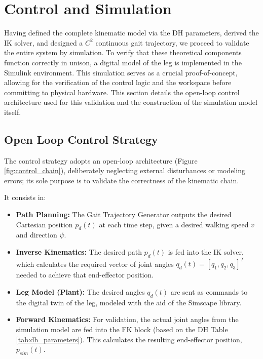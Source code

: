 \section{Control and Simulation}
\label{sc:simulation}

Having defined the complete kinematic model via the DH parameters, derived the IK solver, and designed a $C^2$
continuous gait trajectory, we proceed to validate the entire system by simulation. To verify that these
theoretical components function correctly in unison, a digital model of the leg is implemented in the
Simulink \cite{matlab} environment. This simulation serves as a crucial proof-of-concept, allowing for the
verification of the control logic and the workspace before committing to physical hardware. This section details
the open-loop control architecture used for this validation and the construction of the simulation model itself.


\subsection{Open Loop Control Strategy}

The control strategy adopts an open-loop architecture (Figure \ref{fig:control_chain}), deliberately neglecting
external disturbances or modeling errors; its sole purpose is to validate the correctness of the kinematic chain.

It consists in:

\begin{itemize}
  \item \textbf{Path Planning:} The Gait Trajectory Generator outputs the desired Cartesian position $p_d(t)$
    at each time step, given a desired walking speed $v$ and direction $\psi$.
  \item \textbf{Inverse Kinematics:} The desired path $p_d(t)$ is fed into the IK solver, which
    calculates the required vector of joint angles $q_d(t) = [q_1, q_2, q_3]^T$ needed to achieve
    that end-effector position.
  \item \textbf{Leg Model (Plant):} The desired angles $q_d(t)$ are sent as commands to the
    digital twin of the leg, modeled with the aid of the Simscape library.
  \item \textbf{Forward Kinematics:} For validation, the actual joint angles from the simulation model are
    fed into the FK block (based on the DH Table \ref{tab:dh_parameters}). This calculates the resulting
    end-effector position, $p_{sim}(t)$.
\end{itemize}

